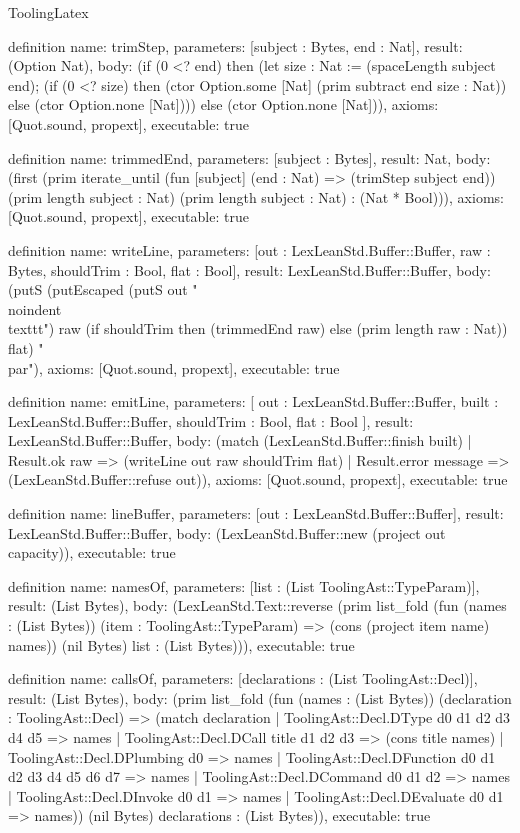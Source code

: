 \begin{lexlean}{ToolingLatex}
\begin{semanticmodule}
definition{
  name: trimStep,
  parameters: [subject : Bytes, end : Nat],
  result: (Option Nat),
  body: (if (0 <? end) then (let size : Nat := (spaceLength subject end); (if (0 <? size) then (ctor Option.some [Nat] (prim subtract end size : Nat)) else (ctor Option.none [Nat]))) else (ctor Option.none [Nat])),
  axioms: [Quot.sound, propext],
  executable: true
}

definition{
  name: trimmedEnd,
  parameters: [subject : Bytes],
  result: Nat,
  body: (first (prim iterate_until (fun [subject] (end : Nat) => (trimStep subject end)) (prim length subject : Nat) (prim length subject : Nat) : (Nat * Bool))),
  axioms: [Quot.sound, propext],
  executable: true
}

definition{
  name: writeLine,
  parameters: [out : LexLeanStd.Buffer::Buffer, raw : Bytes, shouldTrim : Bool, flat : Bool],
  result: LexLeanStd.Buffer::Buffer,
  body: (putS (putEscaped (putS out "\\noindent \\texttt{") raw (if shouldTrim then (trimmedEnd raw) else (prim length raw : Nat)) flat) "}\\par\n"),
  axioms: [Quot.sound, propext],
  executable: true
}

definition{
  name: emitLine,
  parameters: [
    out : LexLeanStd.Buffer::Buffer,
    built : LexLeanStd.Buffer::Buffer,
    shouldTrim : Bool,
    flat : Bool
  ],
  result: LexLeanStd.Buffer::Buffer,
  body: (match (LexLeanStd.Buffer::finish built)
    | Result.ok raw => (writeLine out raw shouldTrim flat)
    | Result.error message => (LexLeanStd.Buffer::refuse out)),
  axioms: [Quot.sound, propext],
  executable: true
}

definition{
  name: lineBuffer,
  parameters: [out : LexLeanStd.Buffer::Buffer],
  result: LexLeanStd.Buffer::Buffer,
  body: (LexLeanStd.Buffer::new (project out capacity)),
  executable: true
}

definition{
  name: namesOf,
  parameters: [list : (List ToolingAst::TypeParam)],
  result: (List Bytes),
  body: (LexLeanStd.Text::reverse (prim list_fold (fun (names : (List Bytes)) (item : ToolingAst::TypeParam) => (cons (project item name) names)) (nil Bytes) list : (List Bytes))),
  executable: true
}

definition{
  name: callsOf,
  parameters: [declarations : (List ToolingAst::Decl)],
  result: (List Bytes),
  body: (prim list_fold (fun (names : (List Bytes)) (declaration : ToolingAst::Decl) => (match declaration
    | ToolingAst::Decl.DType d0 d1 d2 d3 d4 d5 => names
    | ToolingAst::Decl.DCall title d1 d2 d3 => (cons title names)
    | ToolingAst::Decl.DPlumbing d0 => names
    | ToolingAst::Decl.DFunction d0 d1 d2 d3 d4 d5 d6 d7 => names
    | ToolingAst::Decl.DCommand d0 d1 d2 => names
    | ToolingAst::Decl.DInvoke d0 d1 => names
    | ToolingAst::Decl.DEvaluate d0 d1 => names)) (nil Bytes) declarations : (List Bytes)),
  executable: true
}


\end{semanticmodule}
\end{lexlean}
